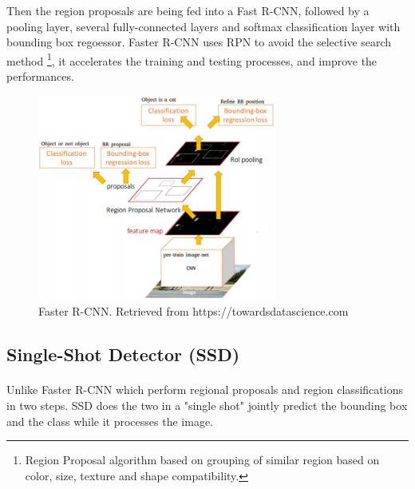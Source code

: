 \documentclass[12pt]{report}
\begin{document}
                Then the region proposals are being fed into a Fast R-CNN, followed by a pooling layer, several fully-connected layers
                and softmax classification layer with bounding box regoessor.
                Faster R-CNN uses RPN to avoid the 
                selective search method \footnote{ Region Proposal algorithm based on grouping of similar region based on color, size, texture and shape compatibility.}, 
                it accelerates the training and testing 
                processes, and improve the performances. \cite{Ren2017a}
                    \begin{figure}[h]
                    \centering
                    \includegraphics[width=0.7\textwidth]{./images/frcnn.png}
                    \caption{Faster R-CNN. Retrieved from https://towardsdatascience.com}
                    \label{fig:frcnn}
                    \end{figure} 

                \subsection{Single-Shot Detector (SSD)}
                \paragraph{}
                    Unlike Faster R-CNN which perform regional proposals 
                    and region classifications in two steps. SSD does the two in a "single shot"
                    jointly predict the bounding box and the class while it processes the image.
\end{document}
